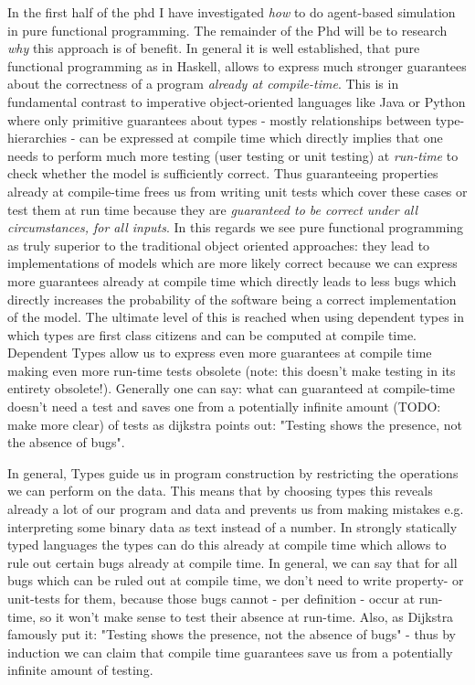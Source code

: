 In the first half of the phd I have investigated \textit{how} to do agent-based simulation in pure functional programming. The remainder of the Phd will be to research \textit{why} this approach is of benefit. In general it is well established, that pure functional programming as in Haskell, allows to express much stronger guarantees about the correctness of a program \textit{already at compile-time}. This is in fundamental contrast to imperative object-oriented languages like Java or Python where only primitive guarantees about types - mostly relationships between type-hierarchies - can be expressed at compile time which directly implies that one needs to perform much more testing (user testing or unit testing) at \textit{run-time} to check whether the model is sufficiently correct. Thus guaranteeing properties already at compile-time frees us from writing unit tests which cover these cases or test them at run time because they are \textit{guaranteed to be correct under all circumstances, for all inputs}. In this regards we see pure functional programming as truly superior to the traditional object oriented approaches: they lead to implementations of models which are more likely correct because we can express more guarantees already at compile time which directly leads to less bugs which directly increases the probability of the software being a correct implementation of the model.
The ultimate level of this is reached when using dependent types in which types are first class citizens and can be computed at compile time. 
Dependent Types allow us to express even more guarantees at compile time making even more run-time tests obsolete (note: this doesn't make testing in its entirety obsolete!). Generally one can say: what can guaranteed at compile-time doesn't need a test and saves one from a potentially infinite amount (TODO: make more clear) of tests as dijkstra points out: "Testing shows the presence, not the absence of bugs".

In general, Types guide us in program construction by restricting the operations we can perform on the data. This means that by choosing types this reveals already a lot of our program and data and prevents us from making mistakes e.g. interpreting some binary data as text instead of a number. In strongly statically typed languages the types can do this already at compile time which allows to rule out certain bugs already at compile time. In general, we can say that for all bugs which can be ruled out at compile time, we don't need to write property- or unit-tests for them, because those bugs cannot - per definition - occur at run-time, so it won't make sense to test their absence at run-time. Also, as Dijkstra famously put it: "Testing shows the presence, not the absence of bugs" - thus by induction we can claim that compile time guarantees save us from a potentially infinite amount of testing.

